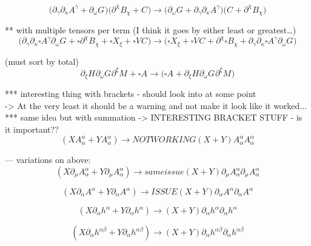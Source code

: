 \documentclass{article}
\def\){\Big)}
\def\({\Big(}
\begin{document}
\begin{equation}
\(\partial_{\gamma} \partial_{\kappa}A^{\gamma}  + \partial_{\omega}G^{} \)\( \partial^{\chi}B_{\chi} + C^{} \) \rightarrow 
\( \partial_{\omega}G^{} + \partial_{\gamma}\partial_{\kappa}A^{\gamma} \)\( C^{} + \partial^{\chi}B_{\chi} \)
\end{equation}

** with multiple tensors per term (I think it goes by either least or greatest…)\\

\begin{equation}
\(\partial_{\gamma} \partial_{\kappa}\square A^{\gamma}\partial_{\omega}G^{} + \square \partial^{\chi}B_{\chi} + \square X_{\xi}+ \square V_{}C^{} \) \rightarrow 
\( \square X_{\xi} + \square V^{} C^{} + \partial^{\chi}\square B_{\chi} + \partial_{\gamma}\partial_{\kappa}\square A^{\gamma} \partial_{\omega}G^{} \)
\end{equation}

(must sort by total)\\
\begin{equation}
 \partial_{\xi}H^{}\partial_{\omega}G^{}\partial^{\xi}M^{} + \square A^{} \rightarrow 
\( \square A^{} + \partial_{\xi}H^{} \partial_{\omega}G^{} \partial^{\xi}M^{} \)
\end{equation}

*** interesting thing with brackets - should look into at some point\\
-> At the very least it should be a warning and not make it look like it worked...\\


*** same idea but with summation -> INTERESTING BRACKET STUFF - is it important??\\

{\color{red}
\begin{equation}
(X A^{\alpha}_{\alpha} + Y A^{\alpha}_{\alpha}) \rightarrow NOT WORKING
(X + Y ) A_{\alpha}^{\alpha} A_{\alpha}^{\alpha}
\end{equation}
}

— variations on above:
{\color{red}
\begin{equation}
(X \partial_{\mu}A^{\alpha}_{\alpha} + Y \partial_{\mu} A^{\alpha}_{\alpha}) \rightarrow same issue
(X + Y ) \partial_{\mu}A_{\alpha}^{\alpha} \partial_{\mu}A_{\alpha}^{\alpha}
\end{equation}
}

{\color{red}
\begin{equation} 
(X \partial_{\alpha}A^{\alpha} + Y \partial_{\alpha} A^{\alpha}) \rightarrow ISSUE
(X + Y ) \partial_{\alpha}A^{\alpha} \partial_{\alpha}A^{\alpha}
\end{equation}
}

\begin{equation}
(X \partial_{\alpha}h^{\alpha} + Y \partial_{\alpha} h^{\alpha}) \rightarrow (X + Y ) \partial_{\alpha}h^{\alpha} \partial_{\alpha}h^{\alpha}
\end{equation}


\begin{equation}
(X \partial_{\alpha}h^{\alpha \beta} + Y \partial_{\alpha} h^{\alpha \beta}) \rightarrow
(X + Y ) \partial_{\alpha}h^{\alpha \beta} \partial_{\alpha}h^{\alpha \beta}
\end{equation}
\end{document}
